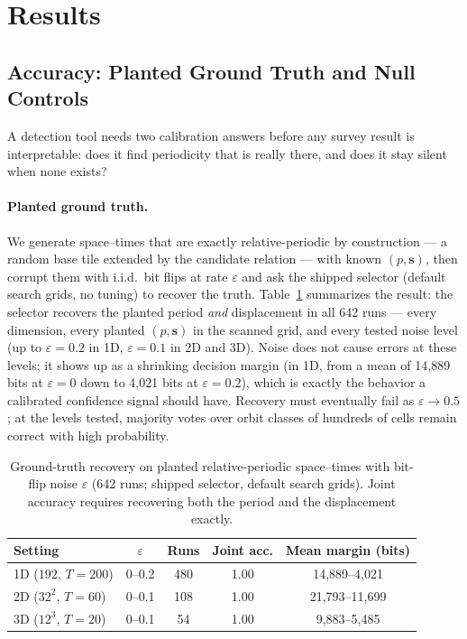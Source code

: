 \documentclass[letterpaper]{article}
\newcommand{\bs}{\mathbf{s}}
\begin{document}
\section{Results}

\subsection{Accuracy: Planted Ground Truth and Null Controls}
\label{sec:accuracy}

A detection tool needs two calibration answers before any survey result
is interpretable: does it find periodicity that is really there, and
does it stay silent when none exists?

\paragraph{Planted ground truth.}
We generate space--times that are exactly relative-periodic by
construction --- a random base tile extended by the candidate relation
--- with known $(p, \bs)$, then corrupt them with i.i.d.\ bit flips at
rate $\varepsilon$ and ask the shipped selector (default search grids,
no tuning) to recover the truth.
Table~\ref{tab:groundtruth} summarizes the result: the selector recovers
the planted period \emph{and} displacement in all 642 runs --- every dimension,
every planted $(p,\bs)$ in the scanned grid, and every tested noise level
(up to $\varepsilon = 0.2$ in 1D, $\varepsilon = 0.1$ in 2D and 3D). Noise does not cause errors at these levels; it
shows up as a shrinking decision margin (in 1D, from a mean of
14{,}889 bits at $\varepsilon{=}0$ down to 4{,}021 bits at
$\varepsilon{=}0.2$), which is exactly the behavior a calibrated
confidence signal should have. Recovery must eventually fail as
$\varepsilon \to 0.5$; at the levels tested, majority votes over
orbit classes of hundreds of cells remain correct with high
probability.

\begin{table}[t]
\centering
\caption{Ground-truth recovery on planted relative-periodic space--times
with bit-flip noise $\varepsilon$ (642 runs; shipped selector, default
search grids). Joint accuracy requires recovering both the period and
the displacement exactly.}
\label{tab:groundtruth}
\small
\begin{tabular}{lcccc}
\toprule
Setting & $\varepsilon$ & Runs & Joint acc. & Mean margin (bits) \\
\midrule
1D ($192$, $T{=}200$) & 0--0.2 & 480 & 1.00 & 14{,}889--4{,}021 \\
2D ($32^2$, $T{=}60$) & 0--0.1 & 108 & 1.00 & 21{,}793--11{,}699 \\
3D ($12^3$, $T{=}20$) & 0--0.1 & 54 & 1.00 & 9{,}883--5{,}485 \\
\bottomrule
\end{tabular}
\end{table}
\end{document}
